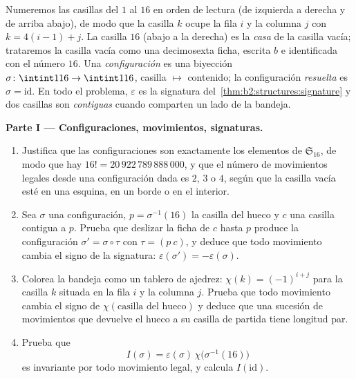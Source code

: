 \begin{problem}
\label{pb:b2:structures:1}
Numeremos las casillas del $1$ al $16$ en orden de lectura (de
izquierda a derecha y de arriba abajo), de modo que la casilla $k$
ocupe la fila $i$ y la columna $j$ con $k = 4(i - 1) + j$. La
casilla $16$ (abajo a la derecha) es la \emph{casa} de la casilla
vacía; trataremos la casilla vacía como una decimosexta ficha,
escrita $b$ e identificada con el número $16$. Una
\emph{configuración} es una biyección $\sigma \colon \intint1{16}
\to \intint1{16}$, casilla $\mapsto$ contenido; la configuración
\emph{resuelta} es $\sigma = \mathrm{id}$. En todo el problema,
$\varepsilon$ es la signatura del~\cref{thm:b2:structures:signature} y dos casillas son
\emph{contiguas} cuando comparten un lado de la bandeja.

\medskip
\noindent\textbf{Parte I --- Configuraciones, movimientos,
signaturas.}
\begin{enumerate}
  \item Justifica que las configuraciones son exactamente los
        elementos de $\mathfrak{S}_{16}$, de modo que hay $16! =
        20\,922\,789\,888\,000$, y que el número de movimientos
        legales desde una configuración dada es $2$, $3$ o $4$,
        según que la casilla vacía esté en una esquina, en un
        borde o en el interior.
  \item Sea $\sigma$ una configuración, $p = \sigma^{-1}(16)$ la
        casilla del hueco y $c$ una casilla contigua a $p$. Prueba
        que deslizar la ficha de $c$ hasta $p$ produce la
        configuración $\sigma' = \sigma \circ \tau$ con $\tau =
        (p\ c)$, y deduce que todo movimiento cambia el signo de
        la signatura: $\varepsilon(\sigma') =
        -\varepsilon(\sigma)$.
  \item Colorea la bandeja como un tablero de ajedrez: $\chi(k) =
        (-1)^{i+j}$ para la casilla $k$ situada en la fila $i$ y
        la columna $j$. Prueba que todo movimiento cambia el signo
        de $\chi(\text{casilla del hueco})$ y deduce que una
        sucesión de movimientos que devuelve el hueco a su casilla
        de partida tiene longitud par.
  \item Prueba que
        \[
        I(\sigma) = \varepsilon(\sigma)\,
        \chi\bigl(\sigma^{-1}(16)\bigr)
        \]
        es invariante por todo movimiento legal, y calcula
        $I(\mathrm{id})$.
\end{enumerate}


\end{problem}
